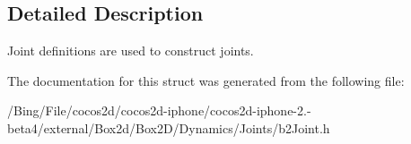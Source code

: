 \subsection{Detailed Description}
Joint definitions are used to construct joints. 

The documentation for this struct was generated from the following file\-:\begin{DoxyCompactItemize}
\item 
/\-Bing/\-File/cocos2d/cocos2d-\/iphone/cocos2d-\/iphone-\/2.-\/beta4/external/\-Box2d/\-Box2\-D/\-Dynamics/\-Joints/b2\-Joint.\-h\end{DoxyCompactItemize}
